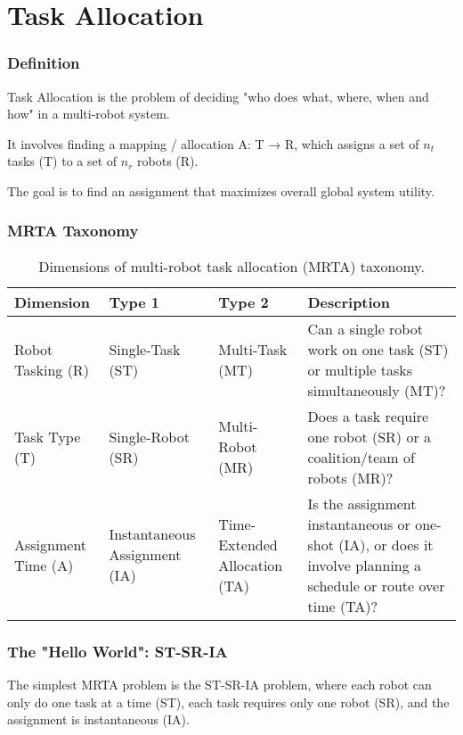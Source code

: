 \chapter*{Task Allocation}

\subsection*{Definition}

Task Allocation is the problem of deciding "who does what, where, when and how" in a multi-robot system.

It involves finding a mapping / allocation A: T → R, which assigns a set of $n_t$ tasks (T) to a set of $n_r$ robots (R).

The goal is to find an assignment that maximizes overall global system utility.

\subsection*{MRTA Taxonomy}

\begin{table}[h!]
\centering
\renewcommand{\arraystretch}{1.2}
\begin{tabularx}{\textwidth}{@{}>{\centering\arraybackslash}p{3cm}|
                                  >{\centering\arraybackslash}p{2.5cm}|
                                  >{\centering\arraybackslash}p{2.5cm}|
                                  X@{}}
\toprule
\textbf{Dimension} & \textbf{Type 1} & \textbf{Type 2} & \textbf{Description} \\ \midrule
Robot Tasking (R) & Single-Task (ST) & Multi-Task (MT) & Can a single robot work on one task (ST) or multiple tasks simultaneously (MT)? \\ \addlinespace
Task Type (T) & Single-Robot (SR) & Multi-Robot (MR) & Does a task require one robot (SR) or a coalition/team of robots (MR)? \\ \addlinespace
Assignment Time (A) & Instantaneous Assignment (IA) & Time-Extended Allocation (TA) & Is the assignment instantaneous or one-shot (IA), or does it involve planning a schedule or route over time (TA)? \\
\bottomrule
\end{tabularx}
\caption{Dimensions of multi-robot task allocation (MRTA) taxonomy.}
\label{tab:mrta-dimensions}
\end{table}

\subsection*{The "Hello World": ST-SR-IA}
The simplest MRTA problem is the ST-SR-IA problem, where each robot can only do one task at a time (ST), each task requires only one robot (SR), and the assignment is instantaneous (IA).

